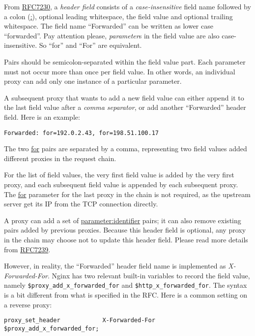 From
\href{https://tools.ietf.org/html/rfc7230#section-3.2}{RFC7230}, a
\textit{header field} consists of a \textit{case-insensitive}
field name followed by a colon (\uline{:}), optional leading
whitespace, the field value and optional trailing whitespace. The
field name ``Forwarded'' can be written as lower case
``forwarded''. Pay attention please, \textit{parameter}s in the
field value are also case-insensitive. So ``for'' and ``For'' are
equivalent.

Pairs should be semicolon-separated within the field value
part. Each parameter must not occur more than once per field
value. In other words, an individual proxy can add only one
instance of a particular parameter.

A subsequent proxy that wants to add a new field value can either
append it to the last field value after a \textit{comma
  separator}, or add another ``Forwarded'' header field. Here is
an example:

\begin{lstlisting}
Forwarded: for=192.0.2.43, for=198.51.100.17
\end{lstlisting}

The two \uline{for} pairs are separated by a comma, representing
two field values added different proxies in the request chain.

For the list of field values, the very first field value is added
by the very first proxy, and each subsequent field value is
appended by each subsequent proxy. The \uline{for} parameter for
the last proxy in the chain is not required, as the upstream
server get its IP from the TCP connection directly.

A proxy can add a set of \uline{parameter:identifier} pairs; it
can also remove existing pairs added by previous proxies. Because
this header field is optional, any proxy in the chain may choose
not to update this header field. Please read more details from
\href{https://tools.ietf.org/html/rfc7239}{RFC7239}.

However, in reality, the ``Forwarded'' header field name is
implemented as \textit{X-Forwarded-For}. Nginx has two relevant
built-in variables to record the field value, namely
\lstinline|$proxy_add_x_forwarded_for| and
\lstinline|$http_x_forwarded_for|. The syntax is a bit different
from what is specified in the RFC. Here is a common setting on a
reverse proxy:

\begin{lstlisting}
proxy_set_header            X-Forwarded-For $proxy_add_x_forwarded_for;
\end{lstlisting}


